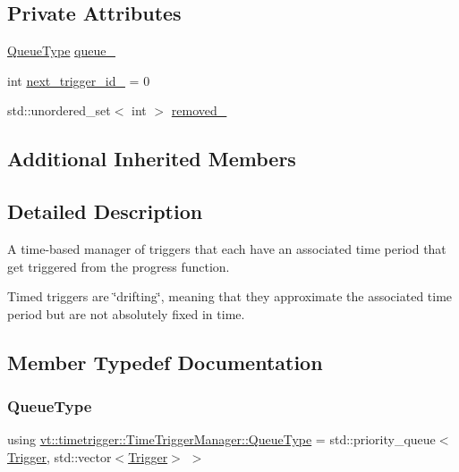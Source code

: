 \subsection*{Private Attributes}
\begin{DoxyCompactItemize}
\item 
\hyperlink{structvt_1_1timetrigger_1_1_time_trigger_manager_ad5dc7eeeb4b0d12a5582544d8f0a08c8}{Queue\+Type} \hyperlink{structvt_1_1timetrigger_1_1_time_trigger_manager_aa7a4a5f115644540035596b1057e2ac2}{queue\+\_\+}
\item 
int \hyperlink{structvt_1_1timetrigger_1_1_time_trigger_manager_a97d23d2d8ae1bafe79456c68db0d5b26}{next\+\_\+trigger\+\_\+id\+\_\+} = 0
\item 
std\+::unordered\+\_\+set$<$ int $>$ \hyperlink{structvt_1_1timetrigger_1_1_time_trigger_manager_aac6dda4fd78e5338f6bec56b75e038cd}{removed\+\_\+}
\end{DoxyCompactItemize}
\subsection*{Additional Inherited Members}


\subsection{Detailed Description}
A time-\/based manager of triggers that each have an associated time period that get triggered from the progress function. 

Timed triggers are \char`\"{}drifting\char`\"{}, meaning that they approximate the associated time period but are not absolutely fixed in time. 

\subsection{Member Typedef Documentation}
\mbox{\label{structvt_1_1timetrigger_1_1_time_trigger_manager_ad5dc7eeeb4b0d12a5582544d8f0a08c8}} 
\subsubsection{\texorpdfstring{Queue\+Type}{QueueType}}
{\footnotesize\ttfamily using \hyperlink{structvt_1_1timetrigger_1_1_time_trigger_manager_ad5dc7eeeb4b0d12a5582544d8f0a08c8}{vt\+::timetrigger\+::\+Time\+Trigger\+Manager\+::\+Queue\+Type} =  std\+::priority\+\_\+queue$<$\hyperlink{structvt_1_1timetrigger_1_1_trigger}{Trigger}, std\+::vector$<$\hyperlink{structvt_1_1timetrigger_1_1_trigger}{Trigger}$>$ $>$}



